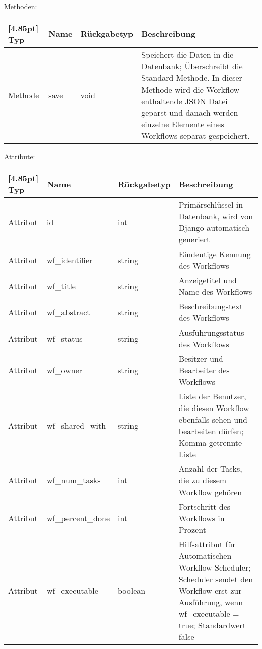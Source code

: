 	        Methoden:
	        \begin{center}
	        	\setlength\tabcolsep{5pt}
	        	\renewcommand{\arraystretch}{1.5}
	        	
	        	\begin{tabularx}{\textwidth}{|l|l|l|X|}
	        		\hline
	        		\rowcolor[gray]{0.75}[4.85pt]
	        		Typ & Name & Rückgabetyp & Beschreibung \\ \hline 
	        		Methode & save & void & Speichert die Daten in die Datenbank; Überschreibt die Standard Methode. In dieser Methode wird die Workflow enthaltende JSON Datei geparst und danach werden einzelne Elemente eines Workflows separat gespeichert. \\ 
	        		\hline
	        	\end{tabularx}
	        \end{center}
                    
            Attribute:
            \begin{center}
            	\renewcommand{\arraystretch}{1.5}
	            \setlength\tabcolsep{5pt}
            	\begin{tabularx}{\textwidth}{|l|l|l|X|}
            		\hline
                    \rowcolor[gray]{0.75}[4.85pt]            		
            	    Typ & Name & Rückgabetyp & Beschreibung \\ \hline
            		Attribut & id & int & Primärschlüssel in Datenbank, wird von Django automatisch generiert \\ \hline
					Attribut & wf\_identifier & string & Eindeutige Kennung des Workflows\\ \hline
					Attribut & wf\_title & string & Anzeigetitel und Name des Workflows\\ \hline
					Attribut & wf\_abstract & string & Beschreibungstext des Workflows\\ \hline					
					Attribut & wf\_status & string & Ausführungsstatus des Workflows\\ \hline
					Attribut & wf\_owner & string & Besitzer und Bearbeiter des Workflows\\ \hline
					Attribut & wf\_shared\_with & string & Liste der Benutzer, die diesen Workflow ebenfalls sehen und bearbeiten dürfen; Komma getrennte Liste\\ \hline
					Attribut & wf\_num\_tasks & int & Anzahl der Tasks, die zu diesem Workflow gehören\\ \hline
					Attribut & wf\_percent\_done & int & Fortschritt des Workflows in Prozent\\ \hline
					Attribut & wf\_executable & boolean & Hilfsattribut für Automatischen Workflow Scheduler; Scheduler sendet den Workflow erst zur Ausführung, wenn wf\_executable = true; Standardwert false \\				
					\hline            		
            	\end{tabularx}
            \end{center}
            
